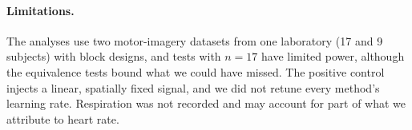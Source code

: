 \paragraph{Limitations.} The analyses use two motor-imagery datasets from one laboratory (17 and 9 subjects) with block designs, and tests with $n=17$ have limited power, although the equivalence tests bound what we could have missed. The positive control injects a linear, spatially fixed signal, and we did not retune every method's learning rate. Respiration was not recorded and may account for part of what we attribute to heart rate.